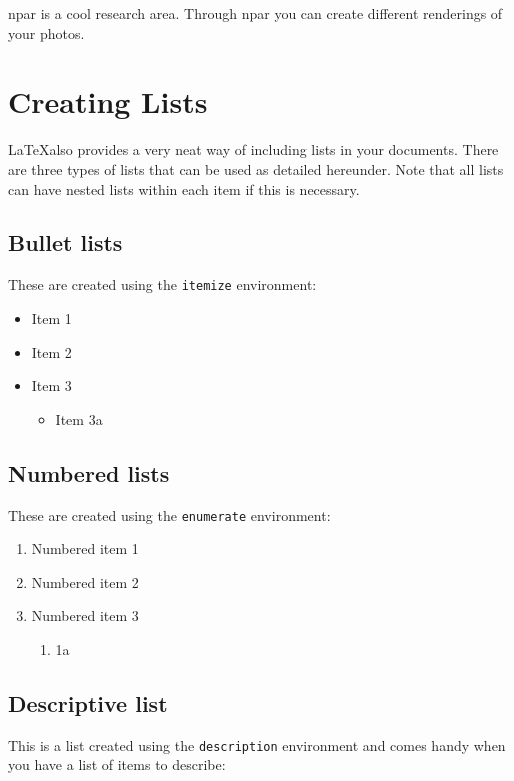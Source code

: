 
 \Gls{npar} is a cool research area. Through \gls{npar} you can create different renderings of your photos.

 \section{Creating Lists}
 \LaTeX also provides a very neat way of including lists in your documents. There are three types of lists that can be used as detailed hereunder. Note that all lists can have nested lists within each item if this is necessary.

 \subsection{Bullet lists}
 These are created using the \texttt{itemize} environment:

 \begin{itemize}
   \item Item 1
   \item Item 2
   \item Item 3
   \begin{itemize}
   	\item Item 3a
   \end{itemize}
 \end{itemize}

 \subsection{Numbered lists}
 These are created using the \texttt{enumerate} environment:
 \begin{enumerate}
   \item Numbered item 1
   \item Numbered item 2
   \item Numbered item 3
   \begin{enumerate}
   	\item 1a
   \end{enumerate}
 \end{enumerate}

 \subsection{Descriptive list}
 This is a list created using the \texttt{description} environment and comes handy when you have a list of items to describe:

